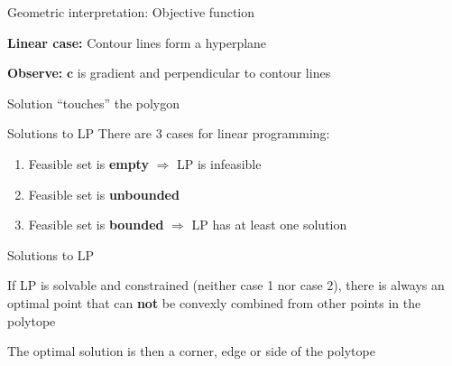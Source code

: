 \documentclass[11pt,compress,t,notes=noshow, xcolor=table]{beamer}
\begin{document}
\begin{framei}{Geometric interpretation: Objective function}
\item \textbf{Linear case:} Contour lines form a hyperplane
\item \textbf{Observe:} $\mathbf{c}$ is gradient and perpendicular to contour lines
\item Solution ``touches'' the polygon
\end{framei}


\begin{framev}{Solutions to LP}
There are 3 cases for linear programming:
\begin{enumerate}
\item Feasible set is \textbf{empty} $\Rightarrow$ LP is infeasible
\item Feasible set is \textbf{unbounded}
\item Feasible set is \textbf{bounded} $\Rightarrow$ LP has at least one solution
\end{enumerate}
\end{framev}


\begin{framei}[sep=L]{Solutions to LP}
\item If LP is solvable and constrained (neither case 1 nor case 2), there is always an optimal point that can \textbf{not} be convexly combined from other points in the polytope
\item The optimal solution is then a corner, edge or side of the polytope
\end{framei}

\endlecture
\end{document}

